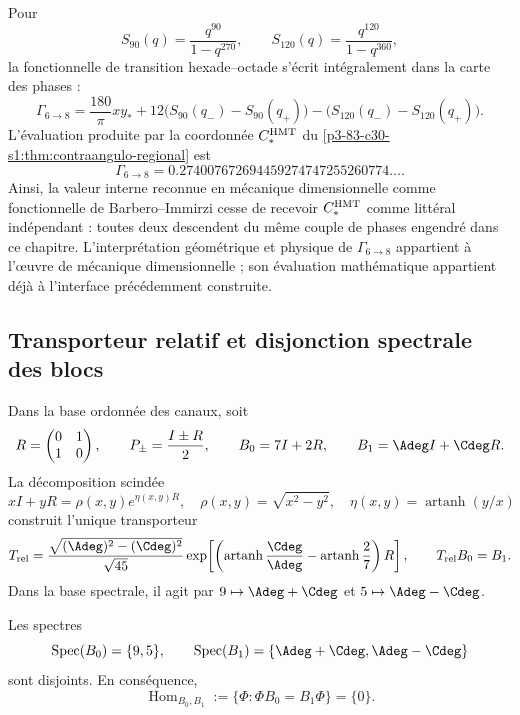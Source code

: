 Pour
\[
S_{90}(q)=\frac{q^{90}}{1-q^{270}},
\qquad
S_{120}(q)=\frac{q^{120}}{1-q^{360}},
\]
la fonctionnelle de transition hexade--octade s'écrit intégralement dans la
carte des phases :
\[
\Gamma_{6\to8}
=\frac{180}{\pi}xy_*
+12\bigl(S_{90}(q_-)-S_{90}(q_+)\bigr)
-\bigl(S_{120}(q_-)-S_{120}(q_+)\bigr).
\]
L'évaluation produite par la coordonnée \(C_*^{\rm HMT}\) du
\cref{p3-83-c30-s1:thm:contraangulo-regional} est
\[
\boxed{
\Gamma_{6\to8}
=0.274007672694459274747255260774\ldots.}
\]
Ainsi, la valeur interne reconnue en mécanique dimensionnelle comme fonctionnelle de
Barbero--Immirzi cesse de recevoir \(C_*^{\rm HMT}\) comme littéral indépendant :
toutes deux descendent du même couple de phases engendré dans ce chapitre.
L'interprétation géométrique et physique de \(\Gamma_{6\to8}\) appartient à l'œuvre
de mécanique dimensionnelle ; son évaluation mathématique appartient déjà à l'interface
précédemment construite.

\subsection{Transporteur relatif et disjonction spectrale des blocs}
\label{sec:s102:c38:6:2}

\label{p3-83-c30-s1:sec:transportador-relativo-split}

Dans la base ordonnée des canaux, soit
\[
 R=\begin{pmatrix}0&1\\1&0\end{pmatrix},
 \qquad P_\pm=\frac{I\pm R}{2},
 \qquad
 B_0=7I+2R,
 \qquad B_1=\Adeg I+\Cdeg R.
\]
La décomposition scindée
\[
 xI+yR=\rho(x,y)e^{\eta(x,y)R},
 \quad \rho(x,y)=\sqrt{x^2-y^2},
 \quad \eta(x,y)=\operatorname{artanh}(y/x)
\]
construit l'unique transporteur
\[
 T_{\rm rel}
 =\frac{\sqrt{(\Adeg)^2-(\Cdeg)^2}}{\sqrt{45}}
   \exp\!\left[
   \left(\operatorname{artanh}\frac{\Cdeg}{\Adeg}
   -\operatorname{artanh}\frac27\right)R\right],
 \qquad T_{\rm rel}B_0=B_1.
\]
Dans la base spectrale, il agit par
\(9\mapsto\Adeg+\Cdeg\) et
\(5\mapsto\Adeg-\Cdeg\).

\begin{theorem}
\label{p3-83-c30-s1:thm:no-go-entrelazador-bloques-split}
Les spectres
\[
 \operatorname{Spec}(B_0)=\{9,5\},\qquad
 \operatorname{Spec}(B_1)=\{\Adeg+\Cdeg,\Adeg-\Cdeg\}
\]
sont disjoints. En conséquence,
\[
 \operatorname{Hom}_{B_0,B_1}
 :=\{\Phi:\Phi B_0=B_1\Phi\}=\{0\}.
\]
\end{theorem}

